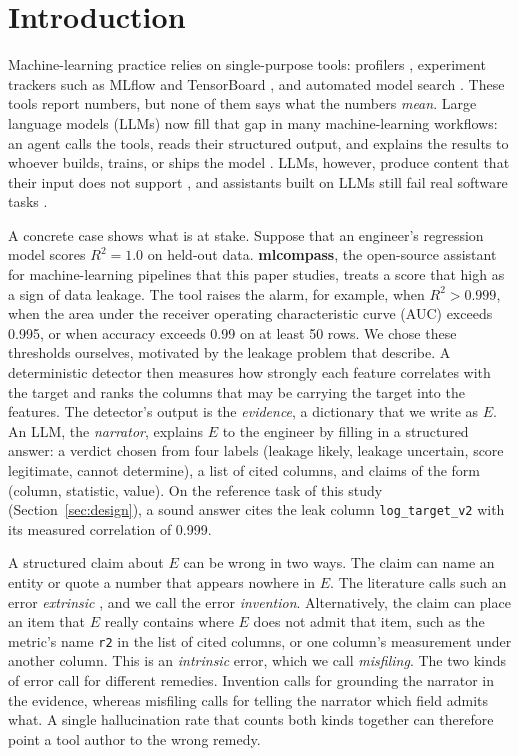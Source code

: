 \documentclass[smallextended,natbib]{svjour3}
\begin{document}
\section{Introduction}\label{sec:intro}

Machine-learning practice relies on single-purpose tools:
profilers \citep{ydata}, experiment trackers such as MLflow and
TensorBoard \citep{mlflow,tensorflow}, and automated model
search \citep{autosklearn}. These tools report numbers, but none of them says what
the numbers \emph{mean}. Large language models (LLMs) now fill
that gap in many machine-learning workflows: an agent calls the tools, reads
their structured output, and explains the results to whoever builds, trains,
or ships the model \citep{react,toolformer,mcp}. LLMs, however, produce
content that their input does not support \citep{ji,huang}, and assistants
built on LLMs still fail real software tasks \citep{codex,swebench}.

A concrete case shows what is at stake. Suppose that an engineer's regression
model scores $R^2=1.0$ on held-out data. \textbf{mlcompass}, the open-source
assistant for machine-learning pipelines that this paper studies, treats a
score that high as a sign of data leakage. The tool raises the alarm, for
example, when $R^2>0.999$, when the area under the receiver operating
characteristic curve (AUC) exceeds 0.995, or when accuracy exceeds 0.99 on at
least 50 rows. We chose these thresholds ourselves, motivated by the leakage
problem that \citet{leakage} describe. A deterministic
detector then measures how strongly each feature correlates with the target
and ranks the columns that may be carrying the target into the features. The
detector's output is the \emph{evidence}, a dictionary that we write as $E$.
An LLM, the \emph{narrator}, explains $E$ to the engineer by filling in a
structured answer: a verdict chosen from four labels (leakage likely, leakage
uncertain, score legitimate, cannot determine), a list of cited columns, and
claims of the form (column, statistic, value). On the reference task of this
study (Section~\ref{sec:design}), a sound answer cites the leak column
\texttt{log\_target\_v2} with its measured correlation of 0.999.

A structured claim about $E$ can be wrong in two ways. The claim can name an
entity or quote a number that appears nowhere in $E$. The literature calls
such an error \emph{extrinsic} \citep{ji,maynez2020faithfulness}, and we call
the error \emph{invention}. Alternatively, the claim can place an item that $E$
really contains where $E$ does not admit that item, such as the metric's name
\texttt{r2} in the list of cited columns, or one column's measurement under
another column. This is an \emph{intrinsic} error, which we call
\emph{misfiling}. The two kinds of error call for different remedies.
Invention calls for grounding the narrator in the evidence, whereas misfiling
calls for telling the narrator which field admits what. A single hallucination
rate that counts both kinds together can therefore point a tool author to the
wrong remedy.
\end{document}
